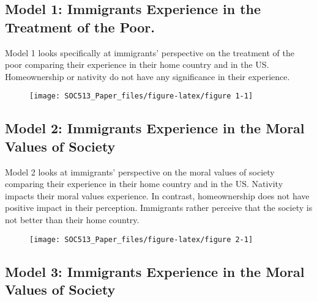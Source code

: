 \documentclass[11pt,]{article}
\begin{document}
\hypertarget{model-1-immigrants-experience-in-the-treatment-of-the-poor.}{%
\subsection{Model 1: Immigrants Experience in the Treatment of the
Poor.}\label{model-1-immigrants-experience-in-the-treatment-of-the-poor.}}

Model 1 looks specifically at immigrants' perspective on the treatment
of the poor comparing their experience in their home country and in the
US. Homeownership or nativity do not have any significance in their
experience.

\begin{figure}

{\centering \texttt{[image: SOC513\_Paper\_files/figure-latex/figure 1-1]} 

}

\end{figure}

\hypertarget{model-2-immigrants-experience-in-the-moral-values-of-society}{%
\subsection{Model 2: Immigrants Experience in the Moral Values of
Society}\label{model-2-immigrants-experience-in-the-moral-values-of-society}}

Model 2 looks at immigrants' perspective on the moral values of society
comparing their experience in their home country and in the US. Nativity
impacts their moral values experience. In contrast, homeownership does
not have positive impact in their perception. Immigrants rather perceive
that the society is not better than their home country.

\begin{figure}

{\centering \texttt{[image: SOC513\_Paper\_files/figure-latex/figure 2-1]} 

}

\end{figure}

\hypertarget{model-3-immigrants-experience-in-the-moral-values-of-society}{%
\subsection{Model 3: Immigrants Experience in the Moral Values of
Society}\label{model-3-immigrants-experience-in-the-moral-values-of-society}}
\end{document}
